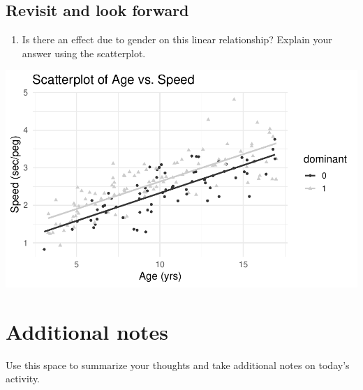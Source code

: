\documentclass[
]{report}
\providecommand{\tightlist}{%
  \setlength{\itemsep}{0pt}\setlength{\parskip}{0pt}}
\begin{document}
\hypertarget{revisit-and-look-forward}{%
\subsection{Revisit and look forward}\label{revisit-and-look-forward}}

\begin{enumerate}
\def\labelenumi{\arabic{enumi}.}
\setcounter{enumi}{22}
\tightlist
\item
  Is there an effect due to gender on this linear relationship? Explain your answer using the scatterplot.
\end{enumerate}

\begin{center}\includegraphics[width=0.7\linewidth]{10-regression_files/figure-latex/unnamed-chunk-6-1} \end{center}

\hypertarget{additional-notes}{%
\section{Additional notes}\label{additional-notes}}

Use this space to summarize your thoughts and take additional notes on today's activity.
\end{document}
